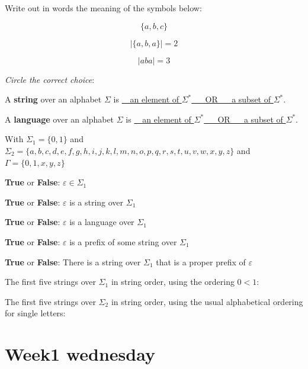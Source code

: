 \documentclass[12pt, oneside]{article}
\begin{document}
\vfill
    
\newpage
Write out in words the meaning of the symbols below: 

\[
    \{ a, b, c\}
\]

\phantom{The set whose elements are $a$, $b$, and $c$}

\[
    | \{a, b, a \} | = 2
\]


\[
    | aba | = 3
\]

\phantom{The length of the string $aba$ is $3$.}

{\it Circle the correct choice}:

A {\bf string} over an alphabet $\Sigma$ is \underline{~~an element of $\Sigma^*$ ~~ OR ~~ a subset of $\Sigma^*$}.
    
A {\bf language} over an alphabet $\Sigma$ is \underline{~~an element of $\Sigma^*$ ~~ OR ~~ a subset of $\Sigma^*$}.


With $\Sigma_1 = \{0,1\}$ and 
$\Sigma_2 = \{a,b,c,d,e,f,g,h,i,j,k,l,m,n,o,p,q,r,s,t,u,v,w,x,y,z\}$
and $\Gamma = \{0,1,x,y,z\}$

{\bf True} or {\bf False}: $\varepsilon \in \Sigma_1$

{\bf True} or {\bf False}: $\varepsilon$ is  a string over $\Sigma_1$

{\bf True} or {\bf False}: $\varepsilon$ is a language over $\Sigma_1$

{\bf True} or {\bf False}: $\varepsilon$ is a prefix of some string over  $\Sigma_1$

{\bf True} or {\bf False}: There is a string over $\Sigma_1$ that is a proper prefix of $\varepsilon$
    

The first five strings over $\Sigma_1$ in string order, using the ordering $0 <  1$: \vfill
    
The first five strings over $\Sigma_2$ in string order, using the usual alphabetical ordering for single letters: \vfill



 \vfill
\section*{Week1 wednesday}
\end{document}
